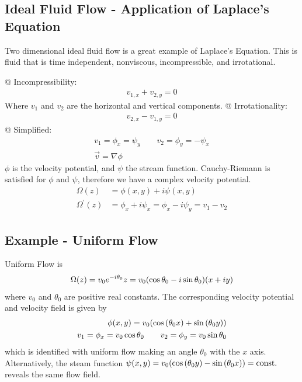     \subsection{Ideal Fluid Flow - Application of Laplace's Equation}
    Two dimensional ideal fluid flow is a great example of Laplace's
    Equation. This is fluid that is time independent, nonviscous,
    incompressible, and irrotational.
    \begin{easylist}[enumerate]
        @ Incompressibility:
        \begin{align*}
            v_{1,x} + v_{2, y} = 0
        \end{align*}
        Where $v_1$ and $v_2$ are the horizontal and vertical components.
        @ Irrotationality:
        \begin{align*}
            v_{2, x} - v_{1, y} = 0
        \end{align*}
        @ Simplified:
        \begin{align*}
            v_1 = \phi_x = \psi_y \qquad v_2 = \phi_y = -\psi_x\\
            \vec{v} = \nabla \phi
        \end{align*}
        $\phi$ is the velocity potential, and $\psi$ the stream function.
        Cauchy-Riemann is satisfied for $\phi$ and $\psi$, therefore we have
        a complex velocity potential.
        \begin{align*}
            \Omega(z) &= \phi(x, y) + i \psi(x, y)\\
            \Omega^\prime(z) &= \phi_x + i \psi_x =
            \phi_x - i \psi_y =
            v_1 - v_2
        \end{align*}
    \end{easylist}

    \subsection{Example - Uniform Flow}
    Uniform Flow is
    \begin{align*}
        \Omega(z) = v_0 e^{-i \theta_0} z =
        v_0 {\left( \cos \theta_0 - i \sin \theta_0 \right)}{\left( x + i y \right)}
    \end{align*}
    where $v_0$ and $\theta_0$ are positive real constants. The
    corresponding velocity potential and velocity field is given by
    \begin{align*}
        \phi(x,y)=v_0{\left( \cos{\left( \theta_0 x \right)}+\sin{\left( \theta_0 y \right)} \right)}\\
        v_1 = \phi_x = v_0 \cos \theta_0 \qquad
        v_2 = \phi_y = v_0 \sin \theta_0
    \end{align*}
    which is identified with uniform flow making an angle $\theta_0$ with
    the $x$ axis. Alternatively, the steam function $\psi(x, y) = v_0
    {\left( \cos{\left( \theta_0 y \right)} - \sin{\left( \theta_0 x \right)} \right)} = \text{const.}$
    reveals the same flow field.

